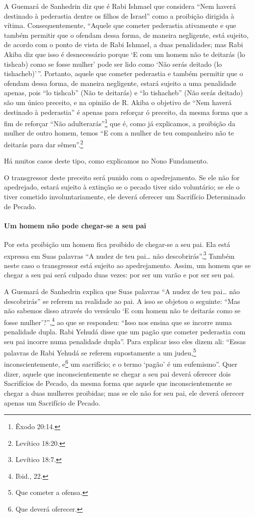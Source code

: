 A Guemará de Sanhedrin diz que é Rabi Ishmael que considera ``Nem haverá
destinado à pederastia dentre os filhos de Israel'' como a proibição
dirigida à vítima. Consequentemente, ``Aquele que cometer pederastia
ativamente e que também permitir que o ofendam dessa forma, de maneira
negligente, está sujeito, de acordo com o ponto de vista de Rabi
Ishmael, a duas penalidades; mas Rabi Akiba diz que isso é
desnecessário porque `E com um homem não te deitarás (lo tishcab) como
se fosse mulher' pode ser lido como `Não serás deitado (lo
tishacheb)'\,''. Portanto, aquele que cometer pederastia e também permitir que o ofendam dessa forma, de maneira negligente, estará
sujeito a uma penalidade apenas, pois ``lo tishcab'' (Não te deitarás) e
``lo tishacheb'' (Não serás deitado) são um único preceito, e na opinião
de R. Akiba o objetivo de ``Nem haverá destinado à pederastia'' é apenas
para reforçar ó preceito, da mesma forma que a fim de reforçar ``Não
adulterarás''\footnote{Êxodo 20:14.} que é, como já explicamos, a proibição da
mulher de outro homem, temos ``E com a mulher de teu companheiro não te
deitarás para dar sêmen''.\footnote{Levítico 18:20.}

Há muitos casos deste tipo, como explicamos no Nono Fundamento.

O transgressor deste preceito será punido com o apedrejamento. Se ele
não for apedrejado, estará sujeito à extinção se o pecado tiver sido
voluntário; se ele o tiver cometido involuntariamente, ele deverá
oferecer um Sacrifício Determinado de Pecado.

\paragraph{Um homem não pode chegar-se a seu pai}

Por esta proibição um homem fica proibido de chegar-se a seu pai. Ela
está expressa em Suas palavras ``A nudez de teu pai\ldots{} não descobrirás''.\footnote{Levítico 18:7.} Também neste caso o transgressor está sujeito ao
apedrejamento. Assim, um homem que se chegar a seu pai será culpado duas
vezes: por ser um varão e por ser seu pai.

A Guemará de Sanhedrin explica que Suas palavras ``A nudez de teu pai\ldots{}
não descobrirás'' se referem na realidade ao pai. A isso se objetou o
seguinte: ``Mas não sabemos disso através do versículo `E com homem não
te deitarás como se fosse mulher'?'',\footnote{Ibid., 22.} ao que se respondeu:
``Isso nos ensina que se incorre numa penalidade dupla. Rabi Yehudá
disse que um pagão que cometer pederastia com seu pai incorre numa
penalidade dupla''. Para explicar isso eles dizem ali: ``Essas palavras
de Rabi Yehudá se referem supostamente a um judeu,\footnote{Que cometer a ofensa.}
inconscientemente, e\footnote{Que deverá oferecer.} um sacrifício; e o termo
`pagão' é um eufemismo''. Quer dizer, aquele que inconscientemente se
chegar a seu pai deverá oferecer dois Sacrifícios de Pecado, da mesma
forma que aquele que inconscientemente se chegar a duas mulheres
proibidas; mas se ele não for seu pai, ele deverá oferecer apenas um
Sacrifício de Pecado.

